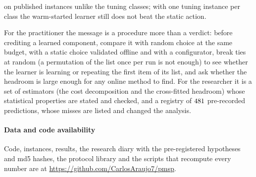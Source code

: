 on published instances unlike the tuning classes; with one tuning instance per class the warm-started learner still does not beat the static action.

For the practitioner the message is a procedure more than a verdict: before crediting a learned component, compare it with random choice at the same budget, with a static choice validated offline and with a configurator, break ties at random (a permutation of the list once per run is not enough) to see whether the learner is learning or repeating the first item of its list, and ask whether the headroom is large enough for any online method to find. For the researcher it is a set of estimators (the cost decomposition and the cross-fitted headroom) whose statistical properties are stated and checked, and a registry of $481$ pre-recorded predictions, whose misses are listed and changed the analysis.

\paragraph{Data and code availability} Code, instances, results, the research diary with the pre-registered hypotheses and md5 hashes, the protocol library and the scripts that recompute every number are at \url{https://github.com/CarlosAraujo7/pmsp}. 
